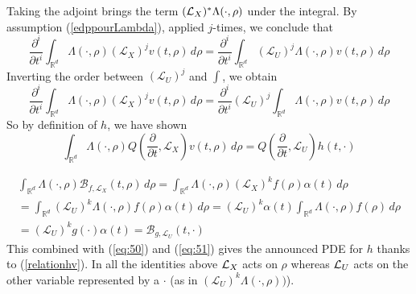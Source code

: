 \documentclass[a4paper, 11pt]{article}
\newcommand{\R}{\mathbb{R}}
\newcommand{\1}{\mathbf{1}}
\begin{document}
Taking the adjoint brings the term $({\cal L}_X)^*\Lambda(\cdot,\rho)$ under the integral. By assumption (\ref{edppourLambda}), applied $j$-times, we conclude that 
\begin{equation*}
\frac{\partial^i}{\partial t^i}\int_{\R^d} \Lambda (\cdot, \rho) (\mathcal{L}_X)^jv(t,\rho) \, d\rho=
\frac{\partial^i}{\partial t^i}\int_{\R^d} (\mathcal{L}_U)^j\Lambda (\cdot, \rho) v(t,\rho) \, d\rho
\end{equation*}
Inverting the order between $(\mathcal{L}_U)^j$ and $\int$, we obtain
\begin{equation*}
\frac{\partial^i}{\partial t^i}\int_{\R^d} \Lambda (\cdot, \rho) (\mathcal{L}_X)^jv(t,\rho) \, d\rho=
\frac{\partial^i}{\partial t^i}(\mathcal{L}_U)^j\int_{\R^d} \Lambda (\cdot, \rho) v(t,\rho) \, d\rho
\end{equation*}
So by definition of $h$, we have shown
\begin{equation}
\label{eq:51}
\int_{\R^d} \Lambda (\cdot, \rho) Q(\frac{\partial}{\partial t},\mathcal{L}_X)v(t,\rho) \, d\rho=
Q(\frac{\partial}{\partial t},\mathcal{L}_U)h(t,\cdot)
\end{equation}

\begin{multline*}
\int_{\R^d} \Lambda (\cdot, \rho) \mathcal{B}_{f,\mathcal{L}_X}(t,\rho) \, d\rho=\int_{\R^d} \Lambda (\cdot, \rho) (\mathcal{L}_X)^kf(\rho)\alpha(t) \, d\rho\\
=\int_{\R^d} (\mathcal{L}_U)^k\Lambda (\cdot, \rho) f(\rho)\alpha(t) \, d\rho
=(\mathcal{L}_U)^k\alpha(t)\int_{\R^d} \Lambda (\cdot, \rho) f(\rho) \, d\rho\\
=(\mathcal{L}_U)^k g(\cdot)\alpha(t)=\mathcal{B}_{g,\mathcal{L}_U}(t,\cdot)
\end{multline*}
This combined with (\ref{eq:50}) and (\ref{eq:51}) gives the announced PDE for $h$ thanks to (\ref{relationhv}). In all the identities above ${\cal L}_X$ acts on $\rho$ whereas ${\cal L}_U$ acts on the other variable represented by a $\cdot$ (as in $(\mathcal{L}_U)^k\Lambda (\cdot, \rho))$). 
 \hfill \framebox[0.6em]{}\\
\bigskip
\end{document}
